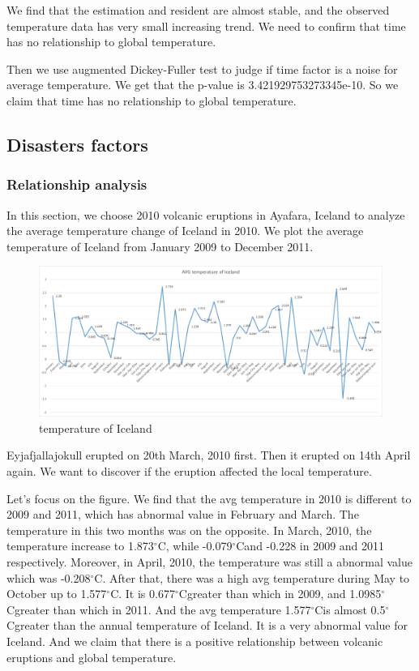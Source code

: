 \documentclass{apmcmthesis}
\def\oc{$^{\circ}$C\;}
\begin{document}
We find that the estimation and resident are almost stable, and the observed temperature data has very small increasing trend. 
We need to confirm that time has no relationship to global temperature.

Then we use augmented Dickey-Fuller test to judge if time factor is a noise for average temperature.
We get that the p-value is 3.421929753273345e-10.
So we claim that time has no relationship to global temperature.


\subsection{Disasters factors}

\subsubsection{Relationship analysis}
In this section, we choose 2010 volcanic eruptions in Ayafara, Iceland to analyze the average temperature change of Iceland in 2010.
We plot the average temperature of Iceland from January 2009 to December 2011.

\begin{figure}[htbp]
  \centering
  \includegraphics[scale=0.45]{Iceland.png}
  \caption{temperature of Iceland}
\end{figure}

Eyjafjallajokull erupted on 20th March, 2010 first.
Then it erupted on 14th April again.
We want to discover if the eruption affected the local temperature. 

Let's focus on the figure.
We find that the avg temperature in 2010 is different to 2009 and 2011, which has abnormal value in February and March.
The temperature in this two months was on the opposite. 
In March, 2010, the temperature increase to 1.873\oc, while -0.079\oc and -0.228 in 2009 and 2011 respectively.
Moreover, in April, 2010, the temperature was still a abnormal value which was -0.208\oc.
After that, there was a high avg temperature during May to October up to 1.577\oc.
It is 0.677\oc greater than which in 2009, and 1.0985\oc greater than which in 2011.
And the avg temperature 1.577\oc is almost 0.5\oc greater than the annual temperature of Iceland.
It is a very abnormal value for Iceland.
And we claim that there is a positive relationship between volcanic eruptions and global temperature. 
\end{document}
